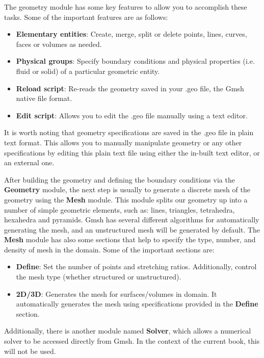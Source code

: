The geometry module has some key features to allow you to accomplish these tasks. Some of the important features are as follows:
\begin{itemize}
    \item \textbf{Elementary entities}: Create, merge, split or delete points, lines, curves, faces or volumes as needed.
    \item \textbf{Physical groups}: Specify boundary conditions and physical properties (i.e. fluid or solid) of a particular geometric entity.
    \item \textbf{Reload script}: Re-reads the geometry saved in your .geo file, the Gmsh native file format.
    \item \textbf{Edit script}: Allows you to edit the .geo file manually using a text editor.
\end{itemize}
It is worth noting that geometry specifications are saved in the .geo file in plain text format. This allows you to manually manipulate geometry or any other specifications by editing this plain text file using either the in-built text editor, or an external one. 

After building the geometry and defining the boundary conditions via the \textbf{Geometry} module, the next step is usually to generate a discrete mesh of the geometry using the \textbf{Mesh} module. This module splits our geometry up into a number of simple geometric elements, such as: lines, triangles, tetrahedra, hexahedra and pyramids. Gmsh has several different algorithms for automatically generating the mesh, and an unstructured mesh will be generated by default. The \textbf{Mesh} module has also some sections that help to specify the type, number, and density of mesh in the domain. Some of the important sections are:
\begin{itemize}
    \item \textbf{Define}: Set the number of points and stretching ratios. Additionally, control the mesh type (whether structured or unstructured).
    \item \textbf{2D/3D}: Generates the mesh for surfaces/volumes in domain. It automatically generates the mesh using specifications provided in the \textbf{Define} section.
\end{itemize}
Additionally, there is another module named \textbf{Solver}, which allows a numerical solver to be accessed directly from Gmsh. In the context of the current book, this will not be used.

